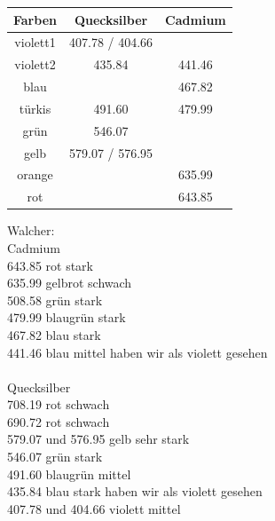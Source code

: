 \begin{table}
\centering
\begin{tabular}{c|c|c}
	Farben & Quecksilber & Cadmium \\
	\hline
	violett1 & 407.78 / 404.66 & \\
	violett2 & 435.84 & 441.46 \\
	blau &  & 467.82 \\
	türkis & 491.60 & 479.99 \\
	grün & 546.07 & \\
	gelb & 579.07 / 576.95 & \\
	orange &  & 635.99 \\
	rot &  & 643.85 \\
\end{tabular}
\end{table}
Walcher: \\
Cadmium \\
643.85	rot			stark \\
635.99	gelbrot		schwach \\
508.58	grün		stark \\
479.99	blaugrün	stark \\
467.82	blau		stark \\
441.46	blau		mittel \qquad haben wir als violett gesehen \\
\ \\
Quecksilber \\
708.19	rot			schwach \\
690.72	rot			schwach \\
579.07 und 576.95	gelb		sehr stark \\
546.07	grün		stark \\
491.60	blaugrün	mittel \\
435.84	blau		stark \qquad haben wir als violett gesehen \\
407.78 und 404.66	violett		mittel \\